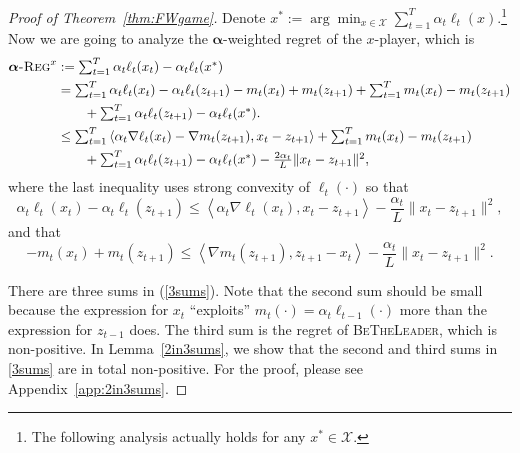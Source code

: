 \documentclass[pmlr]{jmlr} %
\def\balpha{\boldsymbol{\alpha}}
\def\BTL{\textsc{BeTheLeader}\xspace}
\newcommand{\lr}[2]{\left\langle#1,#2\right\rangle}
\newcommand{\regret}[1]{\balpha\textsc{-Reg}^{#1}}
\newcommand{\XX}{\mathcal{X}}
\begin{document}
\begin{proof}[Proof of Theorem~\ref{thm:FWgame}]
	Denote $x^{*} := \arg\min_{x \in \XX} \sum_{t=1}^{T}  \alpha_{t}  \ell_{t}(x)$.\footnote{The following analysis actually holds for any $x^{*} \in \XX$.}
	Now we are going to analyze the $\balpha$-weighted regret of the $x$-player, which is 
	\begin{equation}
	\begin{aligned}
	\regret{x} & \textstyle := \sum_{t=1}^{T} \alpha_{t} \ell_{t}(x_{t}) - \alpha_{t} \ell_{t}(x^{*})
	\\ & \textstyle = \sum_{t=1}^{T} \alpha_{t} \ell_{t}(x_{t})  - \alpha_{t} \ell_{t}(z_{t+1}) - m_{t}(x_{t}) + m_{t}(z_{t+1})
	+ \sum_{t=1}^{T} m_{t}(x_{t}) - m_{t}(z_{t+1})
	\\ & \textstyle \quad \quad + \sum_{t=1}^{T} \alpha_{t} \ell_{t}(z_{t+1}) - \alpha_{t} \ell_{t}(x^{*}).
	\\ & \textstyle\leq \sum_{t=1}^{T} \lr{\alpha_{t} \nabla \ell_{t}(x_{t}) - \nabla m_{t}(z_{t+1}) }{x_{t} - z_{t+1}}
	+ \sum_{t=1}^{T} m_{t}(x_{t}) - m_{t}(z_{t+1})
	\\& \textstyle \quad \quad  + \sum_{t=1}^{T} \alpha_{t} \ell_{t}(z_{t+1}) - \alpha_{t} \ell_{t}(x^{*}) - \frac{2 \alpha_{t}}{L} \| x_{t} - z_{t+1}\|^{2},  \label{3sums}
	\end{aligned}
	\end{equation}
	where the last inequality uses strong convexity of $\ell_{t}(\cdot)$ so that 
	\begin{equation}
\textstyle	\alpha_{t} \ell_{t}(x_{t})  - \alpha_{t} \ell_{t}(z_{t+1}) \leq \lr{\alpha_{t} \nabla \ell_{t}(x_{t})}{x_{t}- z_{t+1}} - \frac{\alpha_{t}}{L} \| x_{t} - z_{t+1}\|^{2},
	\end{equation}
	and that 
	\begin{equation}
\textstyle	- m_{t}(x_{t}) + m_{t}(z_{t+1})
	\leq \lr{\nabla m_{t}(z_{t+1})}{z_{t+1}-x_{t}} - \frac{\alpha_{t}}{L} \| x_{t} - z_{t+1}\|^{2}.
	\end{equation}
	
	There are three sums in (\ref{3sums}). 
	Note that the second sum should be small because the expression for $x_{t}$ ``exploits'' $m_{t}(\cdot) = \alpha_{t} \ell_{t-1}(\cdot)$ more than the expression for $z_{t-1}$ does. The third sum is the regret of \BTL, which is non-positive. 
	In Lemma~\ref{2in3sums}, we show that the second and third sums in \cref{3sums} are in total non-positive. For the proof, please see Appendix~\ref{app:2in3sums}. 
	

\end{proof}
\end{document}
